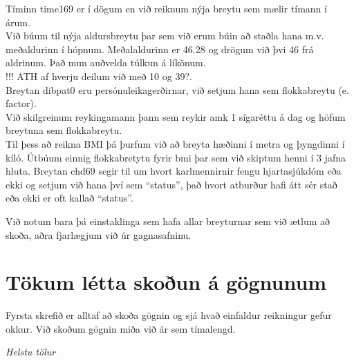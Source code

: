 \documentclass[
]{book}
\begin{document}
Tíminn time169 er í dögum en við reiknum nýja breytu sem mælir tímann í árum.\\
Við búum til nýja aldursbreytu þar sem við erum búin að staðla hana m.v. meðaldurinn í hópnum. Meðalaldurinn er 46.28 og drögum við þvi 46 frá aldrinum. Það mun auðvelda túlkun á líkönum.\\
!!! ATH af hverju deilum við með 10 og 39?.\\
Breytan dibpat0 eru persónuleikagerðirnar, við setjum hana sem flokkabreytu (e. factor).\\
Við skilgreinum reykingamann þann sem reykir amk 1 sígaréttu á dag og höfum breytuna sem flokkabreytu.\\
Til þess að reikna BMI þá þurfum við að breyta hæðinni í metra og þyngdinni í kíló. Útbúum einnig flokkabretytu fyrir bmi þar sem við skiptum henni í 3 jafna hluta.
Breytan chd69 segir til um hvort karlmennirnir fengu hjartasjúkdóm eða ekki og setjum við hana því sem ``status'', það hvort atburður hafi átt sér stað eða ekki er oft kallað ``status''.

Við notum bara þá einstaklinga sem hafa allar breyturnar sem við ætlum að skoða, aðra fjarlægjum við úr gagnasafninu.

\hypertarget{tuxf6kum-luxe9tta-skouxf0un-uxe1-guxf6gnunum}{%
\section{Tökum létta skoðun á gögnunum}\label{tuxf6kum-luxe9tta-skouxf0un-uxe1-guxf6gnunum}}

Fyrsta skrefið er alltaf að skoða gögnin og sjá hvað einfaldur reikningur gefur okkur. Við skoðum gögnin miða við ár sem tímalengd.

\emph{Helstu tölur}
\end{document}
